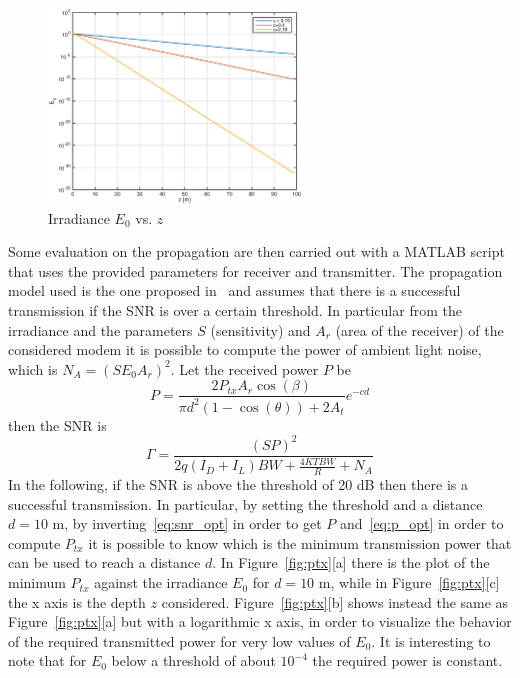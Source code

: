 \documentclass[10pt]{article}
\begin{document}
\begin{figure}[h!]
	\centering
	\includegraphics[width = 0.6\textwidth]{e0_z}
	\caption{Irradiance $E_0$ vs. $z$}
	\label{fig:e0zm}
\end{figure}

Some evaluation on the propagation are then carried out with a MATLAB script that uses the provided parameters for receiver and transmitter. The propagation model used is the one proposed in~\cite{optmodel} and assumes that there is a successful transmission if the SNR is over a certain threshold. In particular from the irradiance and the parameters $S$ (sensitivity) and $A_r$ (area of the receiver) of the considered modem it is possible to compute the power of ambient light noise, which is $N_A = (S E_0 A_r)^2$. Let the received power $P$ be
\begin{equation}
	P = \frac{2 P_{tx} A_r \cos(\beta)}{\pi d^2 (1-\cos(\theta)) + 2 A_t}e^{-cd}
	\label{eq:p_opt}
\end{equation}
then the SNR is
\begin{equation}
	\Gamma  = \frac{(SP)^2}{2q(I_D + I_L)BW + \frac{4KTBW}{R} + N_A}
	\label{eq:snr_opt}
\end{equation}
In the following, if the SNR is above the threshold of 20 dB then there is a successful transmission. In particular, by setting the threshold and a distance $d = 10$ m, by inverting~\eqref{eq:snr_opt} in order to get $P$ and~\eqref{eq:p_opt} in order to compute $P_{tx}$ it is possible to know which is the minimum transmission power that can be used to reach a distance $d$. In Figure~\ref{fig:ptx}[a] there is the plot of the minimum $P_{tx}$ against the irradiance $E_0$ for $d = 10$ m, while in Figure~\ref{fig:ptx}[c] the x axis is the depth $z$ considered. Figure~\ref{fig:ptx}[b] shows instead the same as Figure~\ref{fig:ptx}[a] but with a logarithmic x axis, in order to visualize the behavior of the required transmitted power for very low values of $E_0$. It is interesting to note that for $E_0$ below a threshold of about $10^{-4}$ the required power is constant.
\end{document}
